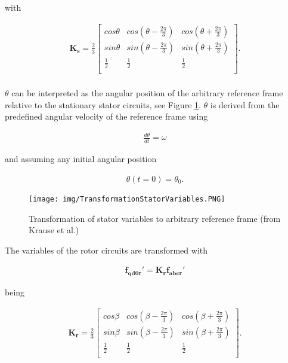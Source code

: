\begin{flushleft}
with

\begin{align*}
\mathbf{K_{s}} = \frac{2}{3}
\begin{bmatrix}
cos \theta & cos(\theta-\frac{2\pi}{3}) & cos(\theta+\frac{2\pi}{3}) \\
sin \theta & sin(\theta-\frac{2\pi}{3}) & sin(\theta+\frac{2\pi}{3}) \\
\frac{1}{2} & \frac{1}{2}  & \frac{1}{2} \\
\end{bmatrix}. \\
\end{align*}

$\theta$ can be interpreted as the angular position of the arbitrary reference frame relative to the stationary stator circuits, see Figure \ref{fig:TransformationStator}. $\theta$ is derived from the predefined angular velocity of the reference frame using

\begin{align*}
\frac{d\theta}{dt} = \omega
\end{align*}

and assuming any initial angular position 

\begin{align*}
\theta(t=0) = \theta_{0}.
\end{align*}

\begin{figure}[h]
	\centering
	\texttt{[image: img/TransformationStatorVariables.PNG]} 
	\caption{Transformation of stator variables to arbitrary reference frame (from Krause et al.)}
	\label{fig:TransformationStator}
\end{figure}

\newpage
The variables of the rotor circuits are transformed with

\begin{align*}
\mathbf{f_{qd0r}'} = \mathbf{K_{r}}\mathbf{f_{abcr}'}
\end{align*}

being

\begin{align*}
\mathbf{K_{r}} = \frac{2}{3}
\begin{bmatrix}
cos \beta & cos(\beta-\frac{2\pi}{3}) & cos(\beta+\frac{2\pi}{3}) \\
sin \beta & sin(\beta-\frac{2\pi}{3}) & sin(\beta+\frac{2\pi}{3}) \\
\frac{1}{2} & \frac{1}{2}  & \frac{1}{2} \\
\end{bmatrix}.
\end{align*}


\end{flushleft}
